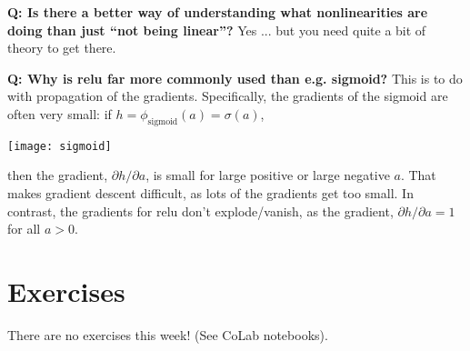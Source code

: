 \documentclass{article}
\begin{document}
\textbf{Q: Is there a better way of understanding what nonlinearities are doing than just ``not being linear''?}
Yes ... but you need quite a bit of theory to get there.

\textbf{Q: Why is relu far more commonly used than e.g. sigmoid?}
This is to do with propagation of the gradients.
Specifically, the gradients of the sigmoid are often very small: if $h = \phi_\text{sigmoid}(a) = \sigma(a)$, 
\begin{center}
  \texttt{[image: sigmoid]}
\end{center}
then the gradient, $\partial h / \partial a$, is small for large positive or large negative $a$.
That makes gradient descent difficult, as lots of the gradients get too small.
In contrast, the gradients for relu don't explode/vanish, as the gradient, $\partial h / \partial a = 1$ for all $a>0$.

\section{Exercises}

There are no exercises this week!  (See CoLab notebooks).
\end{document}
